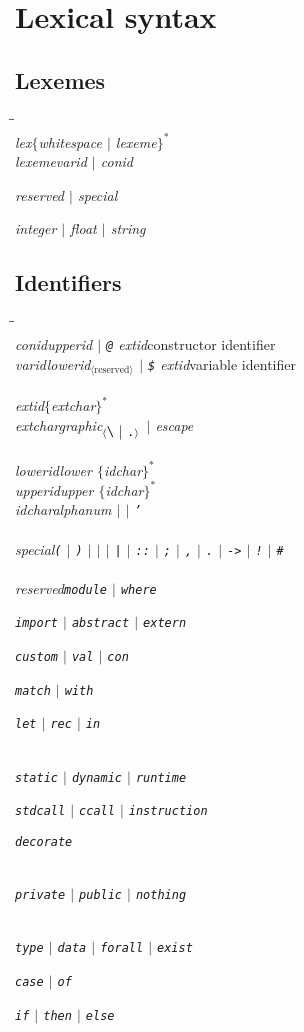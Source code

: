 \documentclass[a4paper,dvips]{article}
\makeatletter
\newcommand{\tthash}{\#}
\newcommand{\ttdollar}{\$}
\newcommand{\ttat}{@}
\newcommand{\ttbackslash}{\char92}
\newcommand{\ttunderscore}{\char95}
\newcommand{\ttlcurly}{\char123}
\newcommand{\ttrcurly}{\char125}
\newenvironment{productions}%
  {\begin{tabbing}\hspace{2cm}\=\hspace{6cm}\=\kill{}\\}%
  {\end{tabbing}}
\newcommand{\fixed}[1]{\makebox[3.5em]{#1}}
\newcommand{\production}[3]{\nont{#1}\>\fixed{$\rightarrow$}\nont{#2}\>#3\\}
\newcommand{\next}[2]{\strut{}\>\fixed{$|$}\nont{#1}\>#2\\}
\newcommand{\nont}[1]{\textit{#1}}
\newcommand{\pspace}{\hspace{0.25ex}}
\newcommand{\many}[1]{$\{$#1\pspace$\}^*$}
\newcommand{\diff}[2]{#1$_{\langle\mbox{#2}\rangle}$}
\newcommand{\term}[1]{{\tt #1}}
\newcommand{\por}{$|$}
\makeatother
\begin{document}
\section{Lexical syntax}

\subsection{Lexemes}
\begin{productions}
\production{lex}{\many{whitespace \por{} lexeme}}{}
\production{lexeme}{varid \por{} conid}{}
\next{reserved \por{} special}{}
\next{integer \por{} float \por{} string}{}
\end{productions}

\subsection{Identifiers}
\begin{productions}
\production{conid}{upperid \por{} \term{\ttat} extid}{constructor identifier}
\production{varid}{\diff{lowerid}{reserved} \por{} \term{\ttdollar} extid}{variable identifier}
\\
\production{extid}{\many{extchar}}{}
\production{extchar}{\diff{graphic}{\term{\ttbackslash} \por{} \term{.}} \por{} escape}{}
\\
\production{lowerid}{lower \many{idchar}}{}
\production{upperid}{upper \many{idchar}}{}
\production{idchar}{alphanum \por{} \term{\ttunderscore} \por{} \term{'}}{}
\\
\production{special}{\term{(} \por{} \term{)} \por{} \term{\ttlcurly} \por{} \term{\ttrcurly} 
        \por{} \term{|} \por{} \term{::} \por{} \term{;} 
        \por{} \term{,} \por{} \term{.} \por{} \term{->} \por{} \term{!} \por{} \term{\tthash}}{}
\\
\production{reserved}{\term{module} \por{} \term{where}}{}
\next{\term{import} \por{} \term{abstract} \por{} \term{extern}}{}
\next{\term{custom} \por{} \term{val} \por{} \term{con}}{} 
\next{\term{match} \por{} \term{with}}{}
\next{\term{let} \por{} \term{rec} \por{} \term{in}}{}
\\
\next{\term{static} \por{} \term{dynamic} \por{} \term{runtime}}{}
\next{\term{stdcall} \por{} \term{ccall} \por{} \term{instruction}}{}
\next{\term{decorate}}{}
\\
\next{\term{private} \por{} \term{public} \por{} \term{nothing}}{}
\\
\next{\term{type} \por{} \term{data} \por{} \term{forall} \por{} \term{exist}}{}
\next{\term{case} \por{} \term{of}}{}
\next{\term{if} \por{} \term{then} \por{} \term{else}}{}
\end{productions}
\end{document}
